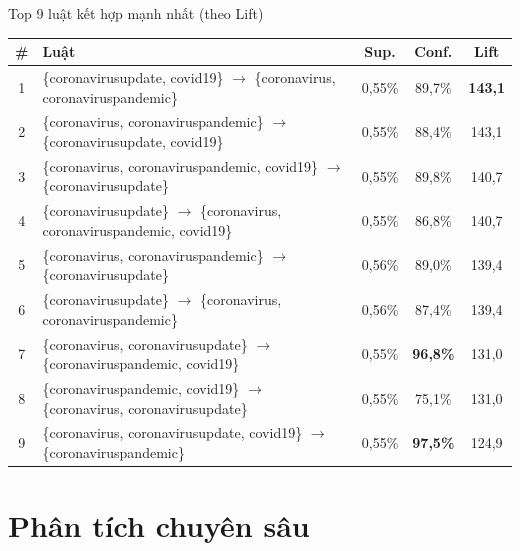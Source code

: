 \documentclass[aspectratio=169]{beamer}
\begin{document}
\begin{frame}{Top 9 luật kết hợp mạnh nhất (theo Lift)}
  \scriptsize
  \begin{tabular}{clccc}
    \toprule
    \textbf{\#} & \textbf{Luật} & \textbf{Sup.} & \textbf{Conf.} & \textbf{Lift} \\
    \midrule
    1 & \{coronavirusupdate, covid19\} $\to$ \{coronavirus, coronaviruspandemic\} & 0,55\% & 89,7\% & \textbf{143,1} \\
    2 & \{coronavirus, coronaviruspandemic\} $\to$ \{coronavirusupdate, covid19\} & 0,55\% & 88,4\% & 143,1 \\
    3 & \{coronavirus, coronaviruspandemic, covid19\} $\to$ \{coronavirusupdate\} & 0,55\% & 89,8\% & 140,7 \\
    4 & \{coronavirusupdate\} $\to$ \{coronavirus, coronaviruspandemic, covid19\} & 0,55\% & 86,8\% & 140,7 \\
    5 & \{coronavirus, coronaviruspandemic\} $\to$ \{coronavirusupdate\}          & 0,56\% & 89,0\% & 139,4 \\
    6 & \{coronavirusupdate\} $\to$ \{coronavirus, coronaviruspandemic\}          & 0,56\% & 87,4\% & 139,4 \\
    7 & \{coronavirus, coronavirusupdate\} $\to$ \{coronaviruspandemic, covid19\} & 0,55\% & \textbf{96,8\%} & 131,0 \\
    8 & \{coronaviruspandemic, covid19\} $\to$ \{coronavirus, coronavirusupdate\} & 0,55\% & 75,1\% & 131,0 \\
    9 & \{coronavirus, coronavirusupdate, covid19\} $\to$ \{coronaviruspandemic\} & 0,55\% & \textbf{97,5\%} & 124,9 \\
    \bottomrule
  \end{tabular}
\end{frame}

\section{Phân tích chuyên sâu}
\end{document}
